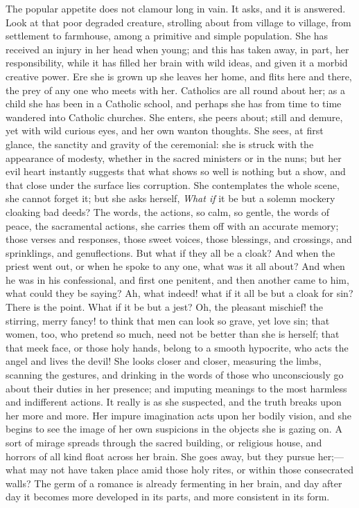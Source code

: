 The popular appetite does not clamour long in vain. It
asks, and it is answered. Look at that poor degraded
creature, strolling about from village to village, from
settlement to farmhouse, among a primitive and simple
population. She has received an injury in her head when
young; and this has taken away, in part, her
responsibility, while it has filled her brain with wild
ideas, and given it a morbid creative power. Ere she is
grown up she leaves her home, and flits here and there,
the prey of any one who meets with her. Catholics are all
round about her; as a child she has been in a Catholic
school, and perhaps she has from time to time wandered
into Catholic churches. She enters, she peers about;
still and demure, yet with wild curious eyes, and her own
wanton thoughts. She sees, at first glance, the sanctity
and gravity of the ceremonial: she is struck with the
appearance of modesty, whether in the sacred ministers or
in the nuns; but her evil heart instantly suggests that
what shows so well is nothing but a show, and that close
under the surface lies corruption. She contemplates the
whole scene, she cannot forget it; but she asks herself, \emph{What
if} it be but a solemn mockery cloaking bad deeds?
The words, the actions, so calm, so gentle, the words of
peace, the sacramental actions, she carries them off with
an accurate memory; those verses and responses, those
sweet voices, those blessings, and crossings, and
sprinklings, and genuflections. But what if they all be a
cloak? And when the priest went out, or when he spoke to
any one, what was it all about? And when he was in his
confessional, and first one penitent, and then another
came to him, what could they be saying? Ah, what indeed!
what if it all be but a cloak for sin? There is the
point. What if it be but a jest? Oh, the pleasant
mischief! the stirring, merry fancy! to think that men
can look so grave, yet love sin; that women, too, who
pretend so much, need not be better than she is herself;
that that meek face, or those holy hands, belong to a
smooth hypocrite, who acts the angel and lives the devil!
She looks closer and closer, measuring the limbs,
scanning the gestures, and drinking in the words of those
who unconsciously go about their duties in her presence;
and imputing meanings to the most harmless and
indifferent actions. It really is as she suspected, and
the truth breaks upon her more and more. Her impure
imagination acts upon her bodily vision, and she begins
to see the image of her own suspicions in the objects she
is gazing on. A sort of mirage spreads through the sacred
building, or religious house, and horrors of all kind
float across her brain. She goes away, but they pursue
her;—what may not have taken place amid those holy
rites, or within those consecrated walls? The germ of a
romance is already fermenting in her brain, and day after
day it becomes more developed in its parts, and more
consistent in its form.

